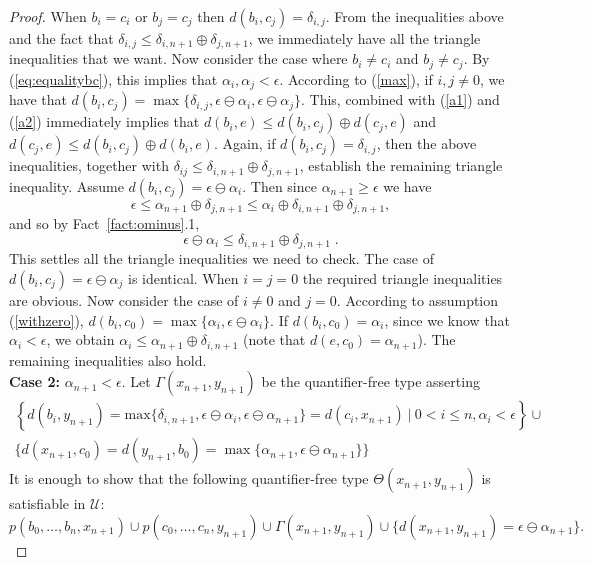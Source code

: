 \documentclass{article}
\theoremstyle{remark}
\theoremstyle{definition}
\newcommand{\U}[0]{\mathbb{U}}
\renewcommand{\U}[0]{\mathcal{U}}
\renewcommand\leq{\leqslant}
\renewcommand\geq{\geqslant}
\begin{document}
{{{{{\begin{proof}
When $b_i=c_i$ or $b_j=c_j$ then $d(b_i,c_j)=\delta_{i,j}$. From the inequalities above and the fact that $\delta_{i,j}\leq \delta_{i,n+1}\oplus\delta_{j,n+1}$, we immediately have all the triangle inequalities that we want. 
Now consider the case where $b_i\neq c_i$ and $b_j\neq c_j$. By (\ref{eq:equalitybc}), this implies that $\alpha_i,\alpha_j< \epsilon$. 
According to (\ref{max}), if $i,j\neq 0$, we have that $d(b_i,c_j)=\max\{\delta_{i,j}, \epsilon\ominus\alpha_i,\epsilon\ominus\alpha_j\}$. This, combined with (\ref{a1}) and (\ref{a2}) immediately implies that    $d(b_i, e)\leq d(b_i,c_j)\oplus d(c_j,e)$ and $d(c_j, e)\leq d(b_i,c_j)\oplus d(b_i,e)$. 
Again, if $d(b_i,c_j)=\delta_{i,j}$, then the above inequalities, together with $\delta_{ij}\leq\delta_{i, n+1}\oplus\delta_{j, n+1}$, establish the remaining triangle inequality. Assume $d(b_i,c_j)=\epsilon\ominus\alpha_i$. Then since $\alpha_{n+1}\geq\epsilon$ we have
\[\epsilon \leq \alpha_{n+1}\oplus\delta_{j, n+1}\leq \alpha_i\oplus\delta_{i, n+1}\oplus\delta_{j, n+1}, \]
and so by Fact~\ref{fact:ominus}.1,
\[ \epsilon\ominus\alpha_i \leq \delta_{i, n+1}\oplus\delta_{j, n+1}\;.\]
This settles all the triangle inequalities we need to check. The case of $d(b_i,c_j)=\epsilon\ominus\alpha_j$ is identical. When $i=j=0$ the required triangle inequalities are obvious. 
Now consider the case of $i\neq 0$ and $j=0$. According to assumption (\ref{withzero}), $d(b_i,c_0)=\max\{\alpha_i,\epsilon\ominus\alpha_i\}$. If $d(b_i,c_0) = \alpha_i$, since we know that $\alpha_i< \epsilon$,  we obtain $\alpha_i\leq \alpha_{n+1}\oplus\delta_{i,n+1}$ (note that $d(e,c_0)=\alpha_{n+1}$).
The %
remaining inequalities also hold. \\
\textbf{Case 2:} $\alpha_{n+1}<\epsilon$.  Let $\Gamma(x_{n+1}, y_{n+1})$ be the quantifier-free type asserting
\begin{align*}
    \left\{d(b_i, y_{n+1})=\mathrm{max}\{\delta_{i, n+1}, \epsilon\ominus\alpha_i, \epsilon\ominus\alpha_{n+1}\}= d(c_i, x_{n+1}) \ \vert \ 0< i\leq n, \alpha_i<\epsilon \right\}\cup\\
\{d(x_{n+1},c_0)=d(y_{n+1},b_0)=\max\{\alpha_{n+1}, \epsilon\ominus\alpha_{n+1}\} \}
\end{align*}
It is enough to show that the following quantifier-free type $\Theta(x_{n+1}, y_{n+1})$ is satisfiable in $\U$:
\begin{equation}\label{typesat2}
     p(b_0, \dots, b_n, x_{n+1})\cup p(c_0, \dots, c_n, y_{n+1}) \cup \Gamma(x_{n+1}, y_{n+1})\cup\{d(x_{n+1}, y_{n+1})=\epsilon\ominus\alpha_{n+1}\}.
\end{equation}

\end{proof}}}}}}
\end{document}
